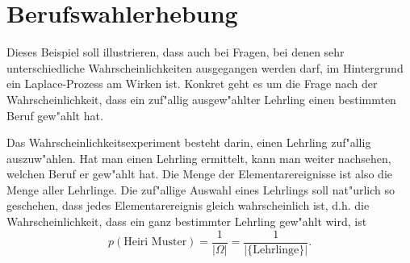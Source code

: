 \section{Berufswahlerhebung}
Dieses Beispiel soll illustrieren, dass auch bei Fragen, bei denen sehr
unterschiedliche Wahrscheinlichkeiten ausgegangen werden darf, im Hintergrund
ein Laplace-Prozess am Wirken ist.
Konkret geht es um die Frage nach der Wahrscheinlichkeit, dass ein 
zuf"allig ausgew"ahlter Lehrling einen bestimmten Beruf gew"ahlt hat.

Das Wahrscheinlichkeitsexperiment besteht darin, einen Lehrling
zuf"allig auszuw"ahlen. Hat man einen Lehrling ermittelt, kann man weiter
nachsehen, welchen Beruf er gew"ahlt hat. Die Menge der Elementarereignisse
ist also die Menge aller Lehrlinge. Die zuf"allige Auswahl eines Lehrlings
soll nat"urlich so geschehen, dass jedes Elementarereignis gleich
wahrscheinlich ist, d.h. die Wahrscheinlichkeit, dass ein ganz
bestimmter Lehrling gew"ahlt wird, ist
\[
p(\text{Heiri Muster})=\frac1{|\Omega|}=\frac1{|\{\text{Lehrlinge}\}|}.
\]

